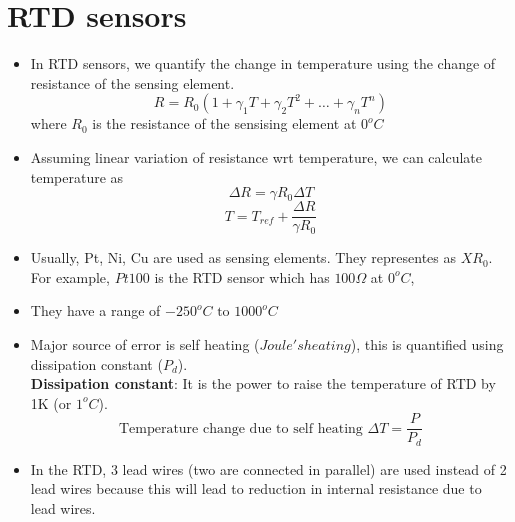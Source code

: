 \documentclass{article}
\begin{document}
\section{RTD sensors}
\begin{itemize}
	\item In RTD sensors, we quantify the change in temperature using the change of resistance of the sensing element.
	\[R = R_0 (1+ \gamma_1 T + \gamma_2 T^2 + \hdots + \gamma_n T^n)\]
	where $R_0$ is the resistance of the sensising element at $0^o C$

	\item Assuming linear variation of resistance wrt temperature, we can calculate temperature as 
	\[\Delta R = \gamma R_0 \Delta T\]
	\[T = T_{ref} + \frac{\Delta R}{\gamma R_0}\]

	\item Usually, Pt, Ni, Cu are used as sensing elements. They representes as $XR_0$. For example, $Pt100$ is the RTD sensor which has $100\Omega$ at $0^o C$,
	\item They have a range of $-250^o C \text{ to } 1000^o C$

	\item Major source of error is self heating ($Joule's heating$), this is quantified using dissipation constant ($P_d$).\\
	\textbf{Dissipation constant}: It is the power to raise the temperature of RTD by 1K (or $1^o C$).\\
	\[\text{Temperature change due to self heating } \Delta T = \frac{P}{P_d}\]

	\item In the RTD, 3 lead wires (two are connected in parallel) are used instead of 2 lead wires because this will lead to reduction in internal resistance due to lead wires. 

\end{itemize}
\end{document}
